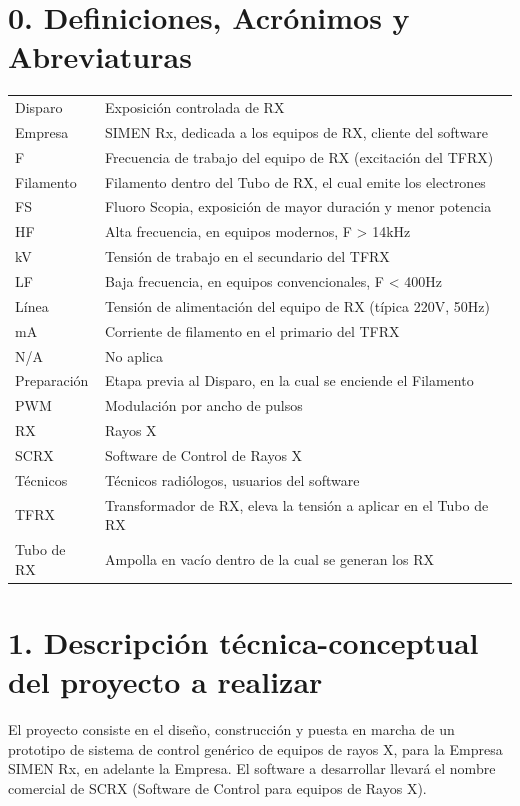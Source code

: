 \documentclass[
11pt, %
]{charter}
\begin{document}
\section{0. Definiciones, Acrónimos y Abreviaturas}
\label{sec:definiciones}
\begin{tabular}{l|l}
	Disparo 		& Exposición controlada de RX \\
	Empresa		& SIMEN Rx, dedicada a los equipos de RX, cliente del software \\
	F 			& Frecuencia de trabajo del equipo de RX (excitación del TFRX) \\
	Filamento	& Filamento dentro del Tubo de RX, el cual emite los electrones \\
	FS 			& Fluoro Scopia, exposición  de mayor duración y menor potencia \\
	HF 			& Alta frecuencia, en equipos modernos, F > 14kHz \\
	kV 			& Tensión de trabajo en el secundario del TFRX \\
	LF 			& Baja frecuencia, en equipos convencionales, F < 400Hz \\
	Línea		& Tensión de alimentación del equipo de RX (típica 220V, 50Hz) \\
	mA			& Corriente de filamento en el primario del TFRX \\
	N/A			& No aplica \\
	Preparación	& Etapa previa al Disparo, en la cual se enciende el Filamento \\
	PWM			& Modulación por ancho de pulsos \\
	RX			& Rayos X \\
	SCRX			& Software de Control de Rayos X \\
	Técnicos		& Técnicos radiólogos, usuarios del software \\
	TFRX			& Transformador de RX, eleva la tensión a aplicar en el Tubo de RX \\
	Tubo de RX	& Ampolla en vacío dentro de la cual se generan los RX \\
\end{tabular} 



\section{1. Descripción técnica-conceptual del proyecto a realizar}
\label{sec:descripcion}

El proyecto consiste en el diseño, construcción y puesta en marcha de un prototipo de sistema de control genérico de equipos de rayos X, para la Empresa SIMEN Rx, en adelante la Empresa. El software a desarrollar llevará el nombre comercial de SCRX (Software de Control para equipos de Rayos X).
\end{document}

